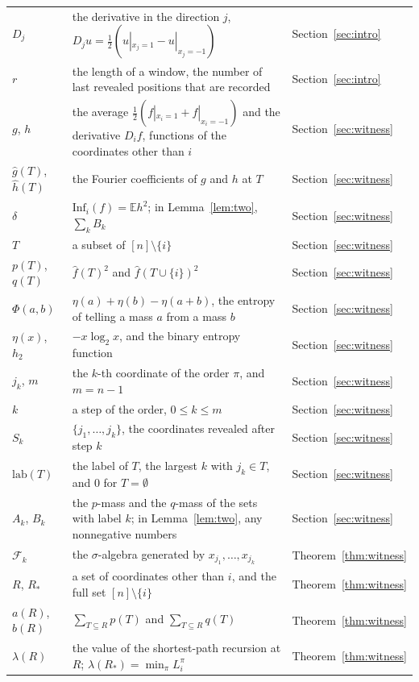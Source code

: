 \documentclass[11pt]{amsart}
\theoremstyle{remark}
\newcommand{\Inf}{\mathrm{Inf}}
\newcommand{\E}{\mathbb{E}}
\newcommand{\lab}{\mathrm{lab}}
\begin{document}
\begin{longtable}{@{}>{\raggedright\arraybackslash}p{}>{\raggedright\arraybackslash}p{}>{\raggedright\arraybackslash}p{}@{}}
$D_j$ & the derivative in the direction $j$, $D_ju=\tfrac12(u|_{x_j=1}-u|_{x_j=-1})$ & Section~\ref{sec:intro} \\
$r$ & the length of a window, the number of last revealed positions that are recorded & Section~\ref{sec:intro} \\
$g$, $h$ & the average $\tfrac12(f|_{x_i=1}+f|_{x_i=-1})$ and the derivative $D_if$, functions of the coordinates other than $i$ & Section~\ref{sec:witness} \\
$\hat g(T)$, $\hat h(T)$ & the Fourier coefficients of $g$ and $h$ at $T$ & Section~\ref{sec:witness} \\
$\delta$ & $\Inf_i(f)=\E h^2$; in Lemma~\ref{lem:two}, $\sum_kB_k$ & Section~\ref{sec:witness} \\
$T$ & a subset of $[n]\setminus\{i\}$ & Section~\ref{sec:witness} \\
$p(T)$, $q(T)$ & $\hat f(T)^2$ and $\hat f(T\cup\{i\})^2$ & Section~\ref{sec:witness} \\
$\Phi(a,b)$ & $\eta(a)+\eta(b)-\eta(a+b)$, the entropy of telling a mass $a$ from a mass $b$ & Section~\ref{sec:witness} \\
$\eta(x)$, $h_2$ & $-x\log_2x$, and the binary entropy function & Section~\ref{sec:witness} \\
$j_k$, $m$ & the $k$-th coordinate of the order $\pi$, and $m=n-1$ & Section~\ref{sec:witness} \\
$k$ & a step of the order, $0\le k\le m$ & Section~\ref{sec:witness} \\
$S_k$ & $\{j_1,\dots,j_k\}$, the coordinates revealed after step $k$ & Section~\ref{sec:witness} \\
$\lab(T)$ & the label of $T$, the largest $k$ with $j_k\in T$, and $0$ for $T=\emptyset$ & Section~\ref{sec:witness} \\
$A_k$, $B_k$ & the $p$-mass and the $q$-mass of the sets with label $k$; in Lemma~\ref{lem:two}, any nonnegative numbers & Section~\ref{sec:witness} \\
$\mathcal F_k$ & the $\sigma$-algebra generated by $x_{j_1},\dots,x_{j_k}$ & Theorem~\ref{thm:witness} \\
$R$, $R_*$ & a set of coordinates other than $i$, and the full set $[n]\setminus\{i\}$ & Theorem~\ref{thm:witness} \\
$a(R)$, $b(R)$ & $\sum_{T\subseteq R}p(T)$ and $\sum_{T\subseteq R}q(T)$ & Theorem~\ref{thm:witness} \\
$\lambda(R)$ & the value of the shortest-path recursion at $R$; $\lambda(R_*)=\min_\pi L^\pi_i$ & Theorem~\ref{thm:witness} \\

\end{longtable}
\end{document}
